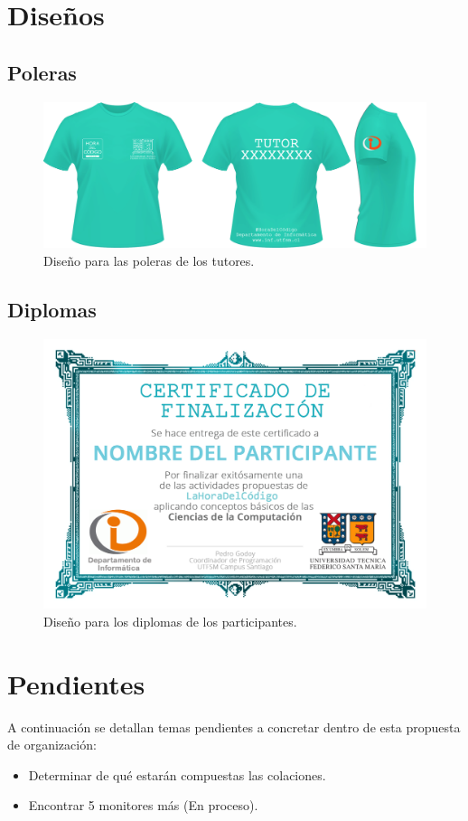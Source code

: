 \documentclass[letterpaper,12pt]{article}
\begin{document}
\vfill

\section{Diseños}

\subsection{Poleras}

\begin{figure}[H]
  \centering
    \includegraphics[width=1.0\textwidth]{poleras.jpg}
  \caption{Diseño para las poleras de los tutores.}
\end{figure}

\subsection{Diplomas}

\begin{figure}[H]
  \centering
    \includegraphics[width=1.0\textwidth]{diploma.png}
  \caption{Diseño para los diplomas de los participantes.}
\end{figure}

\section{Pendientes}

A continuación se detallan temas pendientes a concretar dentro de esta propuesta de organización:

\begin{itemize}

  \item Determinar de qué estarán compuestas las colaciones.
  \item Encontrar 5 monitores más (En proceso).

\end{itemize}
\end{document}
